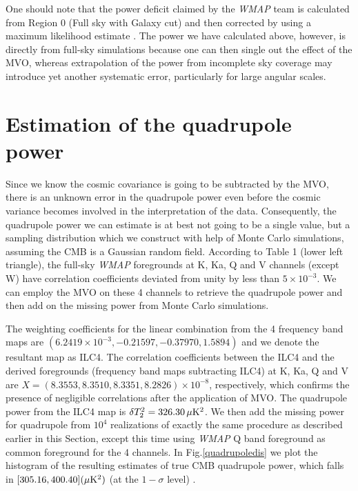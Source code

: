 \documentclass{emulateapj}
\def\wmap{{\sl WMAP }}
\begin{document}
One should note that the power deficit claimed by the \wmap team is
calculated from Region 0 (Full sky with Galaxy cut) and then
corrected by using a maximum likelihood estimate \citep{wmap3ytem}. The power we have
calculated above, however, is directly from full-sky simulations
because one can then single out the effect of the MVO, whereas
extrapolation of the power from incomplete sky coverage may
introduce yet another systematic error, particularly for large
angular scales.


\section{Estimation of the quadrupole power}
Since we know the cosmic covariance is going to be subtracted by the
MVO, there is an unknown error in the quadrupole power even before
the cosmic variance becomes involved in the interpretation of the
data. Consequently, the quadrupole power we can  estimate is at best
not going to be a single value, but a sampling distribution which we
construct with help of Monte Carlo simulations, assuming the CMB is
a Gaussian random field. According to Table 1 (lower left triangle),
the full-sky \wmap foregrounds at K, Ka, Q and V channels (except W)
have correlation coefficients deviated from unity by less than $5
\times 10^{-3}$. We can employ the MVO on these 4 channels to retrieve the quadrupole power and then add on the missing power from Monte Carlo simulations.


The weighting coefficients for the linear combination from the 4 frequency band maps 
are $(6.2419 \times 10^{-3}, -0.21597, -0.37970, 1.5894)$ and we denote the resultant map 
as ILC4. The correlation coefficients between the ILC4 and the derived foregrounds (frequency band maps subtracting ILC4) at K, Ka, Q and V are $ X=(8.3553, 8.3510, 8.3351, 8.2826) \times 10^{-8}$, respectively,
which confirms the presence of negligible correlations after the application of MVO.
The quadrupole power from the ILC4 map is $\delta T_2^2 = 326.30
\,\mu{\rm K}^2$. We then add the missing power for quadrupole from
$10^4$ realizations of exactly the same procedure as described
earlier in this Section, except this time using \wmap Q band foreground as common foreground for the 4 channels. In Fig.\ref{quadrupoledis} we plot the histogram of the resulting
estimates of true CMB quadrupole power, which falls in
$[305.16,400.40] (\mu {\rm K}^2)$ (at the $1-\sigma$ level) .
\end{document}
